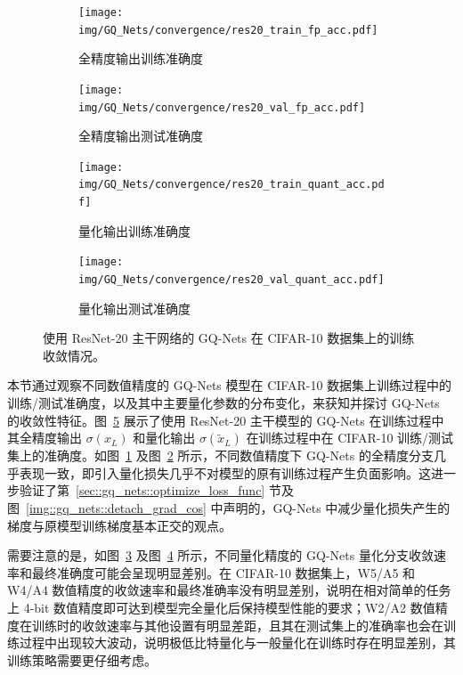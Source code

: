 \documentclass[
  fontset = mac,
]{shtthesis}
\begin{document}
\begin{figure}[htb]
  \centering
  \begin{subfigure}[t]{0.45\columnwidth}
    \centering
    \texttt{[image: img/GQ\_Nets/convergence/res20\_train\_fp\_acc.pdf]}
    \caption{全精度输出训练准确度}
    \label{img::gq_nets::res20_train_fp_acc}
  \end{subfigure}
  \quad
  \begin{subfigure}[t]{0.45\columnwidth}
    \centering
    \texttt{[image: img/GQ\_Nets/convergence/res20\_val\_fp\_acc.pdf]}
    \caption{全精度输出测试准确度}
    \label{img::gq_nets::res20_eval_fp_acc}
  \end{subfigure}
  \newline
  \vspace*{0.5 cm}
  \newline
  \begin{subfigure}[t]{0.45\columnwidth}
    \centering
    \texttt{[image: img/GQ\_Nets/convergence/res20\_train\_quant\_acc.pdf]}
    \caption{量化输出训练准确度}
    \label{img::gq_nets::res20_train_quant_acc}
  \end{subfigure}
  \quad
  \begin{subfigure}[t]{0.45\columnwidth}
    \centering
    \texttt{[image: img/GQ\_Nets/convergence/res20\_val\_quant\_acc.pdf]}
    \caption{量化输出测试准确度}
    \label{img::gq_nets::res20_eval_quant_acc}
  \end{subfigure}
  \caption{使用 ResNet-20 主干网络的 GQ-Nets 在 CIFAR-10 数据集上的训练收敛情况。}
  \label{img::gq_nets::res20_convergence}
\end{figure}

本节通过观察不同数值精度的 GQ-Nets 模型在 CIFAR-10 数据集上训练过程中的训练/测试准确度，以及其中主要量化参数的分布变化，来获知并探讨 GQ-Nets 的收敛性特征。图~\ref{img::gq_nets::res20_convergence} 展示了使用 ResNet-20 主干模型的 GQ-Nets 在训练过程中其全精度输出 $\sigma(x_L)$ 和量化输出 $\sigma(\tilde{x}_L)$ 在训练过程中在 CIFAR-10 训练/测试集上的准确度。如图~\ref{img::gq_nets::res20_train_fp_acc} 及图~\ref{img::gq_nets::res20_eval_fp_acc} 所示，不同数值精度下 GQ-Nets 的全精度分支几乎表现一致，即引入量化损失几乎不对模型的原有训练过程产生负面影响。这进一步验证了第~\ref{sec::gq_nets::optimize_loss_func} 节及图~\ref{img::gq_nets::detach_grad_cos} 中声明的，GQ-Nets 中减少量化损失产生的梯度与原模型训练梯度基本正交的观点。

需要注意的是，如图~\ref{img::gq_nets::res20_train_quant_acc} 及图~\ref{img::gq_nets::res20_eval_quant_acc} 所示，不同量化精度的 GQ-Nets 量化分支收敛速率和最终准确度可能会呈现明显差别。在 CIFAR-10 数据集上，W5/A5 和 W4/A4 数值精度的收敛速率和最终准确率没有明显差别，说明在相对简单的任务上 4-bit 数值精度即可达到模型完全量化后保持模型性能的要求；W2/A2 数值精度在训练时的收敛速率与其他设置有明显差距，且其在测试集上的准确率也会在训练过程中出现较大波动，说明极低比特量化与一般量化在训练时存在明显差别，其训练策略需要更仔细考虑。
\end{document}
